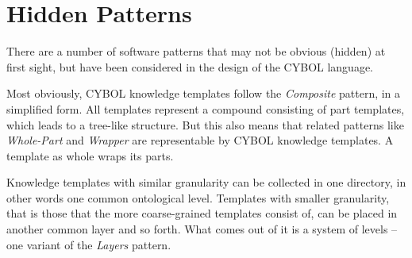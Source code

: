 %
%
%
%
%
%

\section{Hidden Patterns}
\label{hidden_patterns_heading}

There are a number of software patterns that may not be obvious (hidden) at
first sight, but have been considered in the design of the CYBOL language.

Most obviously, CYBOL knowledge templates follow the \emph{Composite} pattern,
in a simplified form. All templates represent a compound consisting of part
templates, which leads to a tree-like structure. But this also means that related
patterns like \emph{Whole-Part} and \emph{Wrapper} are representable by CYBOL
knowledge templates. A template as whole wraps its parts.

Knowledge templates with similar granularity can be collected in one directory,
in other words one common ontological level. Templates with smaller granularity,
that is those that the more coarse-grained templates consist of, can be placed
in another common layer and so forth. What comes out of it is a system of levels
-- one variant of the \emph{Layers} pattern.

